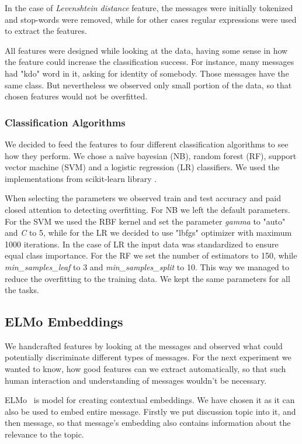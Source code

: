 \documentclass[11pt,a4paper]{article}
\begin{document}
In the case of \textit{Levenshtein distance} feature,  the messages were initially tokenized and stop-words \cite{sloStopWords} were removed, while for other cases regular expressions were used to extract the features.

All features were designed while looking at the data, having some sense in how the feature could increase the classification success. For instance, many messages  had "kdo" word in it, asking for identity of somebody. Those messages have the same class. But nevertheless we observed only small portion of the data, so that chosen features would not be overfitted.

\subsubsection{Classification Algorithms}
\label{sssc:class-alg}
We decided to feed the features to four different classification algorithms to see how they perform. We chose a na\^ive bayesian (NB), random forest (RF), support vector machine (SVM) and a logistic regression (LR) classifiers. We used the implementations from scikit-learn library \cite{scikit-learn}.

When selecting the parameters we observed train and test accuracy and paid closed attention to detecting overfitting. For NB we left the default parameters. For the SVM we used the RBF kernel and set the parameter \textit{gamma} to "auto" and \textit{C} to 5, while for the LR we decided to use "lbfgs" optimizer with maximum 1000 iterations. In the case of LR the input data was standardized to ensure equal class importance. For the RF we set the number of estimators to 150, while \textit{min\_samples\_leaf} to 3 and \textit{min\_samples\_split} to 10. This way we managed to reduce the overfitting to the training data. We kept the same parameters for all the tasks.

\subsection{ELMo Embeddings}
We handcrafted features by looking at the messages and observed what could potentially discriminate different types of messages. For the next experiment we wanted to know, how good features can we extract automatically, so that such human interaction and understanding of messages wouldn't be necessary.

ELMo~\cite{peters2018deep} is model for creating contextual embeddings. We have chosen it as it can also be used to embed entire message. Firstly we put discussion topic into it, and then message, so that message's embedding also contains information about the relevance to the topic.
\end{document}
